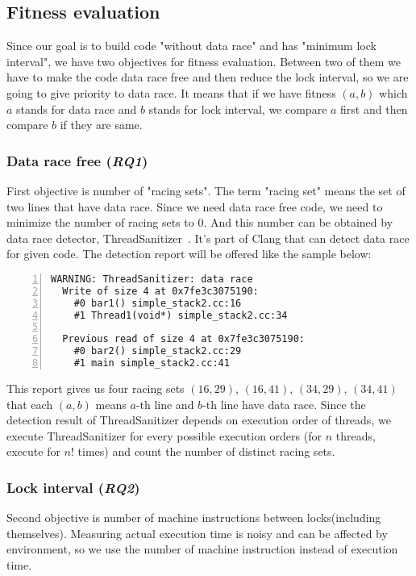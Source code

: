 \subsection{Fitness evaluation}
Since our goal is to build code "without data race" and has "minimum lock interval", we have two objectives for fitness evaluation. Between two of them we have to make the code data race free and then reduce the lock interval, so we are going to give priority to data race. It means that if we have fitness $(a, b)$ which $a$ stands for data race and $b$ stands for lock interval, we compare $a$ first and then compare $b$ if they are same.

\subsubsection{Data race free (\textit{RQ1})}
First objective is number of "racing sets". The term "racing set" means the set of two lines that have data race. Since we need data race free code, we need to minimize the number of racing sets to 0. And this number can be obtained by data race detector, ThreadSanitizer~\cite{Serebryany:2009:TDR:1791194.1791203}. It's part of Clang that can detect data race for given code. The detection report will be offered like the sample below:


\begin{lstlisting}[frame=tb, xleftmargin=2em, framexleftmargin=1.5em, numbers=left]
WARNING: ThreadSanitizer: data race
  Write of size 4 at 0x7fe3c3075190:
    #0 bar1() simple_stack2.cc:16
    #1 Thread1(void*) simple_stack2.cc:34

  Previous read of size 4 at 0x7fe3c3075190:
    #0 bar2() simple_stack2.cc:29
    #1 main simple_stack2.cc:41
\end{lstlisting}

This report gives us four racing sets $(16, 29)$, $(16, 41)$, $(34, 29)$, $(34, 41)$ that each $(a, b)$ means $a$-th line and $b$-th line have data race. Since the detection result of ThreadSanitizer depends on execution order of threads, we execute ThreadSanitizer for every possible execution orders (for $n$ threads, execute for $n!$ times) and count the number of distinct racing sets.
 
\subsubsection{Lock interval (\textit{RQ2})}
Second objective is number of machine instructions between locks(including themselves). Measuring actual execution time is noisy and can be affected by environment, so we use the number of machine instruction instead of execution time.

